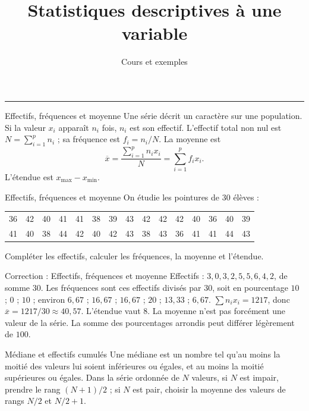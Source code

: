 \documentclass[aspectratio=169,10pt]{beamer}
\title{Statistiques descriptives à une variable}
\subtitle{Cours et exemples}
\date{}
\author{}
\begin{document}
\begin{frame}[plain]
\vfill
{\inserttitle\par}
\medskip
{\insertsubtitle\par}
\medskip
{\rule{\textwidth}{.5pt}}
\vfill
\end{frame}
\begin{frame}{Effectifs, fréquences et moyenne}
Une série décrit un caractère sur une population. Si la valeur \(x_i\) apparaît \(n_i\) fois, \(n_i\) est son effectif. L'effectif total non nul est \(N=\sum_{i=1}^{p}n_i\) ; sa fréquence est \(f_i=n_i/N\). La moyenne est
\[\overline x=\dfrac{\sum_{i=1}^{p}n_ix_i}{N}=\sum_{i=1}^{p}f_ix_i.\]
L'étendue est \(x_{\max}-x_{\min}\).
\end{frame}
\begin{frame}{Effectifs, fréquences et moyenne}
On étudie les pointures de \(30\) élèves :
  \begin{center}\begin{tabular}{lllllllllllllll}
36 & 42 & 40 & 41 & 41 & 38 & 39 & 43 & 42 & 42 & 42 & 40 & 36 & 40 & 39 \\ 
41 & 40 & 38 & 44 & 42 & 40 & 42 & 43 & 38 & 43 & 36 & 41 & 41 & 44 & 43 \\ 
\end{tabular}\end{center} 
Compléter les effectifs, calculer les fréquences, la moyenne et l'étendue.
\end{frame}
\begin{frame}{Correction : Effectifs, fréquences et moyenne}
Effectifs : \(3,0,3,2,5,5,6,4,2\), de somme \(30\). Les fréquences sont ces effectifs divisés par \(30\), soit en pourcentage \(10\) ; \(0\) ; \(10\) ; environ \(6{,}67\) ; \(16{,}67\) ; \(16{,}67\) ; \(20\) ; \(13{,}33\) ; \(6{,}67\).
\(\sum n_ix_i=1217\), donc \(\overline x=1217/30\approx40{,}57\). L'étendue vaut \(8\). La moyenne n'est pas forcément une valeur de la série. La somme des pourcentages arrondis peut différer légèrement de \(100\).
\end{frame}
\begin{frame}{Médiane et effectifs cumulés}
Une médiane est un nombre tel qu'au moins la moitié des valeurs lui soient inférieures ou égales, et au moins la moitié supérieures ou égales.
Dans la série ordonnée de \(N\) valeurs, si \(N\) est impair, prendre le rang \((N+1)/2\) ; si \(N\) est pair, choisir la moyenne des valeurs de rangs \(N/2\) et \(N/2+1\).
\end{frame}
\end{document}
